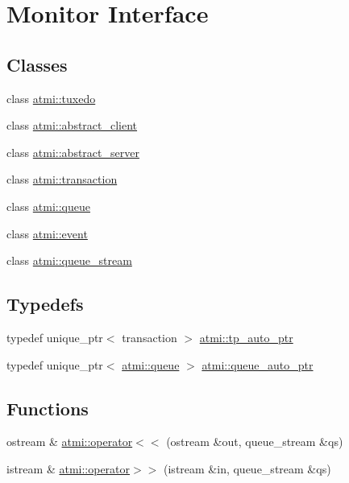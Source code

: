 \hypertarget{group___application-to-_transaction}{\section{Monitor Interface}
\label{group___application-to-_transaction}
}
\subsection*{Classes}
\begin{DoxyCompactItemize}
\item 
class \hyperlink{classatmi_1_1tuxedo}{atmi\+::tuxedo}
\item 
class \hyperlink{classatmi_1_1abstract__client}{atmi\+::abstract\+\_\+client}
\item 
class \hyperlink{classatmi_1_1abstract__server}{atmi\+::abstract\+\_\+server}
\item 
class \hyperlink{classatmi_1_1transaction}{atmi\+::transaction}
\item 
class \hyperlink{classatmi_1_1queue}{atmi\+::queue}
\item 
class \hyperlink{classatmi_1_1event}{atmi\+::event}
\item 
class \hyperlink{classatmi_1_1queue__stream}{atmi\+::queue\+\_\+stream}
\end{DoxyCompactItemize}
\subsection*{Typedefs}
\begin{DoxyCompactItemize}
\item 
typedef unique\+\_\+ptr$<$ transaction $>$ \hyperlink{group___application-to-_transaction_ga4a71d76e59908eb5ec5e53269c2742b5}{atmi\+::tp\+\_\+auto\+\_\+ptr}
\item 
typedef unique\+\_\+ptr$<$ \hyperlink{classatmi_1_1queue}{atmi\+::queue} $>$ \hyperlink{group___application-to-_transaction_ga9eff55eddc901da817f1b087613b18cc}{atmi\+::queue\+\_\+auto\+\_\+ptr}
\end{DoxyCompactItemize}
\subsection*{Functions}
\begin{DoxyCompactItemize}
\item 
ostream \& \hyperlink{group___application-to-_transaction_gaf3fe9481b5d6e19d1fb56e27baff2154}{atmi\+::operator$<$$<$} (ostream \&out, queue\+\_\+stream \&qs)
\item 
istream \& \hyperlink{group___application-to-_transaction_gadb0ca17e8de1eecddb5c95b86441ffdc}{atmi\+::operator$>$$>$} (istream \&in, queue\+\_\+stream \&qs)
\end{DoxyCompactItemize}


